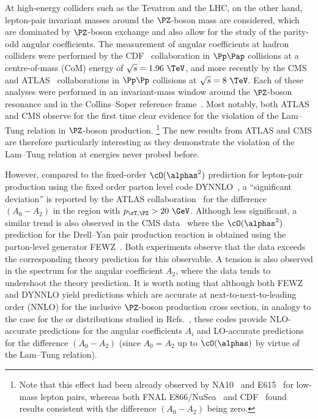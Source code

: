 At high-energy colliders such as the Tevatron and the LHC, on the other hand, lepton-pair invariant masses around the $\PZ$-boson mass are considered, which are dominated by $\PZ$-boson exchange and also allow for the study of the parity-odd angular coefficients.
The measurement of angular coefficients at hadron colliders were performed 
by the CDF~\cite{Aaltonen:2011nr} collaboration in $\Pp\Pap$ collisions at a centre-of-mass (CoM)
energy of $\sqrt{s} = 1.96~\TeV$, and more recently by the CMS~\cite{Khachatryan:2015paa} and 
ATLAS~\cite{Aad:2016izn} collaborations in $\Pp\Pp$ 
collisions at $\sqrt{s} = 8~\TeV$.
%
Each of these analyses were performed in an invariant-mass window around the $\PZ$-boson resonance and in the Collins--Soper reference frame~\cite{Collins:1977iv}. 
%
Most notably, both ATLAS and CMS observe for the first time clear evidence for 
the violation of the Lam--Tung relation in $\PZ$-boson production.%
\footnote{
Note that this effect had been already observed  
by NA10~\cite{Guanziroli:1987rp} and E615~\cite{Conway:1989fs} for low-mass lepton pairs, whereas 
both FNAL E866/NuSea~\cite{Zhu:2006gx, Zhu:2008sj} and CDF~\cite{Aaltonen:2011nr} found results 
consistent with the difference $(A_0-A_2)$ being zero.
}
%
The new results from ATLAS and CMS are therefore particularly interesting as they 
demonstrate the violation of the Lam--Tung relation at energies never probed before.  

However, compared to the fixed-order $\cO(\alphas^2)$ prediction for 
lepton-pair production using the fixed order parton level code DYNNLO~\cite{Catani:2009sm}, a ``significant deviation'' is reported by the ATLAS collaboration~\cite{Aad:2016izn} for the difference $(A_0-A_2)$ in the region with $\ptz >20~\GeV$. 
Although less significant, a similar trend is also observed in the CMS data~\cite{Khachatryan:2015paa} where the $\cO(\alphas^2)$ prediction for the Drell--Yan pair production reaction is obtained 
using the parton-level generator FEWZ~\cite{Gavin:2010az}. 
Both experiments observe that the data exceeds the corresponding theory prediction for this observable. 
A tension is also observed in the \ptz spectrum for the angular coefficient $A_2$, where the data tends to undershoot the theory prediction.   
%
It is worth noting that although both FEWZ and DYNNLO yield predictions which are accurate at
next-to-next-to-leading order (NNLO) for the inclusive $\PZ$-boson production cross section, in analogy 
to the case for the \ptz or \phistar distributions studied in Refs.~\cite{Ridder:2016nkl,Gehrmann-DeRidder:2016jns}, 
these codes provide NLO-accurate predictions for the angular coefficients $A_i$ and LO-accurate 
predictions for the difference $(A_0 -A_2)$ (since $A_0 = A_2$ 
up to $\cO(\alphas)$ by virtue of the Lam--Tung relation).

